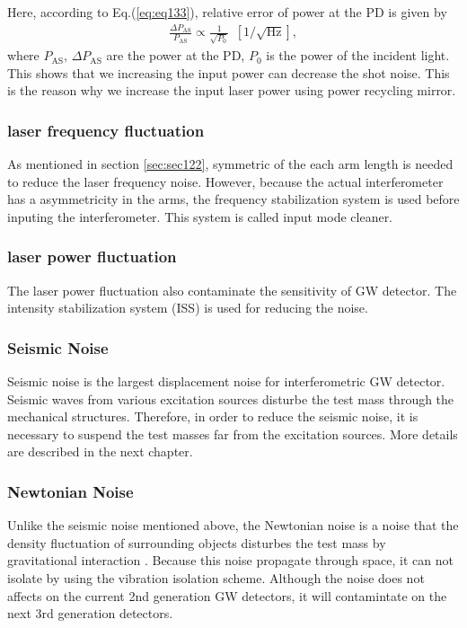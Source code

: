 Here, according to Eq.(\ref{eq:eq133}), relative error of power at the PD is given by 
\begin{eqnarray}
  \frac{\Delta P_{\mathrm{AS}}}{P_{\mathrm{AS}}}  \propto \frac{1}{\sqrt{P_{\mathrm{0}}}}\ \ [1/\sqrt{\mathrm{Hz}}],  \label{eq:eq136}
\end{eqnarray}
where $P_{\mathrm{AS}},\,\Delta P_{\mathrm{AS}}$ are the power at the PD, $P_0$ is the power of the incident light. This shows that we increasing the input power can decrease the shot noise. This is the reason why we increase the input laser power using power recycling mirror.

\subsubsection{laser frequency fluctuation}
As mentioned in section \ref{sec:sec122}, symmetric of the each arm length is needed to reduce the laser frequency noise. However, because the actual interferometer has a asymmetricity in the arms, the frequency stabilization system is used before inputing the interferometer. This system is called input mode cleaner.

\subsubsection{laser power fluctuation}
The laser power fluctuation also contaminate the sensitivity of GW detector. The intensity stabilization system (ISS) is used for reducing the noise.

\subsubsection{Seismic Noise}
Seismic noise is the largest displacement noise for interferometric GW detector. Seismic waves from various excitation sources disturbe the test mass through the mechanical structures. Therefore, in order to reduce the seismic noise, it is necessary to suspend the test masses far from the excitation sources. More details are described in the next chapter.

\subsubsection{Newtonian Noise}
Unlike the seismic noise mentioned above, the Newtonian noise is a noise that the density fluctuation of surrounding objects disturbes the test mass by gravitational interaction \cite{harms2015terrestrial}. Because this noise propagate through space, it can not isolate by using the vibration isolation scheme. Although the noise does not affects on the current 2nd generation GW detectors, it will contamintate on the next 3rd generation detectors.

